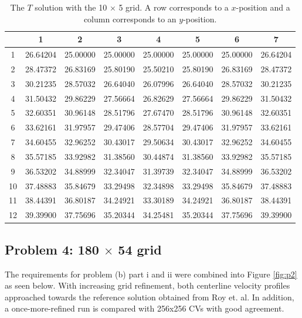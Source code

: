 \documentclass{article}
\begin{document}
\def\arraystretch{1.3}
\begin{table}[H]
	\scriptsize
	\centering
	\caption{The $T$ solution with the 10 $\times$ 5 grid. A row corresponds to a $x$-position and a column corresponds to an $y$-position.}
	\vspace{0.2cm}
	\begin{tabular}{c|S|S|S|S|S|S|S}
		& {1} & {2} & {3} & {4} & {5} & {6} & {7} \\
		 & 26.64204 & 25.00000 & 25.00000 & 25.00000 & 25.00000 & 25.00000 & 26.64204 \\
			2 & 28.47372 & 26.83169 & 25.80190 & 25.50210 & 25.80190 & 26.83169 & 28.47372 \\
			3 & 30.21235 & 28.57032 & 26.64040 & 26.07996 & 26.64040 & 28.57032 & 30.21235 \\
			4 & 31.50432 & 29.86229 & 27.56664 & 26.82629 & 27.56664 & 29.86229 & 31.50432 \\
			5 & 32.60351 & 30.96148 & 28.51796 & 27.67470 & 28.51796 & 30.96148 & 32.60351 \\
			6 & 33.62161 & 31.97957 & 29.47406 & 28.57704 & 29.47406 & 31.97957 & 33.62161 \\
			7 & 34.60455 & 32.96252 & 30.43017 & 29.50634 & 30.43017 & 32.96252 & 34.60455 \\
			8 & 35.57185 & 33.92982 & 31.38560 & 30.44874 & 31.38560 & 33.92982 & 35.57185 \\
			9 & 36.53202 & 34.88999 & 32.34047 & 31.39739 & 32.34047 & 34.88999 & 36.53202 \\
			10 & 37.48883 & 35.84679 & 33.29498 & 32.34898 & 33.29498 & 35.84679 & 37.48883 \\
			11 & 38.44391 & 36.80187 & 34.24921 & 33.30189 & 34.24921 & 36.80187 & 38.44391 \\
			12 & 39.39900 & 37.75696 & 35.20344 & 34.25481 & 35.20344 & 37.75696 & 39.39900 \\
	\end{tabular}
	\label{table:coarse-T}
\end{table}

\subsection{Problem 4: 180 $\times$ 54 grid}

The requirements for problem (b) part i and ii were combined into Figure \ref{fig:p2} as seen below. With increasing grid refinement, both centerline velocity profiles approached towards the reference solution obtained from Roy et. al. In addition, a once-more-refined run is compared with 256x256 CVs with good agreement.
\end{document}
